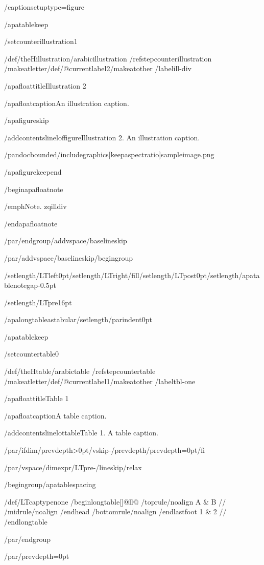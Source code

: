 /captionsetup{type=figure}

/apatablekeep

/setcounter{illustration}{1}

/def/theHillustration{/arabic{illustration}}%
/refstepcounter{illustration}%
/makeatletter/def/@currentlabel{2}/makeatother%
/label{ill-div}

/apafloattitle{Illustration 2}

/apafloatcaption{An illustration caption.}

/apafigureskip

/addcontentsline{lof}{figure}{Illustration 2. An illustration caption.}

/pandocbounded{/includegraphics[keepaspectratio]{sampleimage.png}}

/apafigurekeepend

/begin{apafloatnote}

/emph{Note}. zqilldiv

/end{apafloatnote}

/par/endgroup/addvspace{/baselineskip}

/par/addvspace{/baselineskip}/begingroup

/setlength{/LTleft}{0pt}/setlength{/LTright}{/fill}/setlength{/LTpost}{0pt}/setlength{/apatablenotegap}{-0.5pt}

/setlength{/LTpre}{16pt}

/apalongtableastabular/setlength{/parindent}{0pt}

/apatablekeep

/setcounter{table}{0}

/def/theHtable{/arabic{table}}%
/refstepcounter{table}%
/makeatletter/def/@currentlabel{1}/makeatother%
/label{tbl-one}

/apafloattitle{Table 1}

/apafloatcaption{A table caption.}

/addcontentsline{lot}{table}{Table 1. A table caption.}

/par/ifdim/prevdepth>0pt/vskip-/prevdepth/prevdepth=0pt/fi

/par/vspace{/dimexpr/LTpre-/lineskip/relax}

/begingroup/apatablespacing

{/def/LTcaptype{none} %
/begin{longtable}[]{@{}ll@{}}
/toprule/noalign{}
A & B //
/midrule/noalign{}
/endhead
/bottomrule/noalign{}
/endlastfoot
1 & 2 //
/end{longtable}
}

/par/endgroup

/par/prevdepth=0pt

